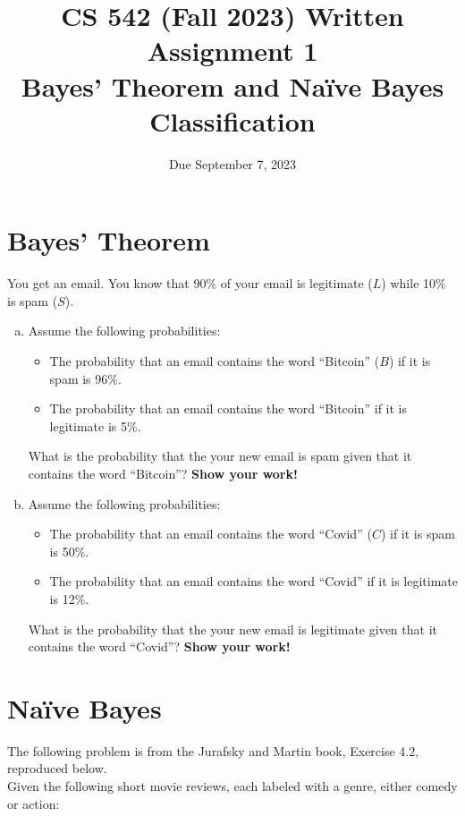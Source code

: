 \documentclass[11pt,letterpaper]{article}
\begin{document}
\title{CS 542 (Fall 2023) Written Assignment 1\\Bayes' Theorem and Na\"ive Bayes Classification}
\author{Due September 7, 2023}
\date{}
\maketitle

\section{Bayes' Theorem}

You get an email.  You know that 90\% of your email is legitimate ($L$) while 10\% is spam ($S$).

\begin{enumerate}[a.]
	\item Assume the following probabilities:
	\begin{itemize}
		\item The probability that an email contains the word ``Bitcoin'' ($B$) if it is spam is 96\%.
		\item The probability that an email contains the word ``Bitcoin'' if it is legitimate is 5\%.
	\end{itemize}
	What is the probability that the your new email is spam given that it contains the word ``Bitcoin''? \textbf{Show your work!}
	\item Assume the following probabilities:
	\begin{itemize}
		\item The probability that an email contains the word ``Covid'' ($C$) if it is spam is 50\%.
		\item The probability that an email contains the word ``Covid'' if it is legitimate is 12\%.
	\end{itemize}
	What is the probability that the your new email is legitimate given that it contains the word ``Covid''? \textbf{Show your work!}
\end{enumerate}

\section{Na\"ive Bayes}

The following problem is from the Jurafsky and Martin book, Exercise 4.2, reproduced below.\\

\noindent Given the following short movie reviews, each labeled with a genre, either comedy or action:
\end{document}
